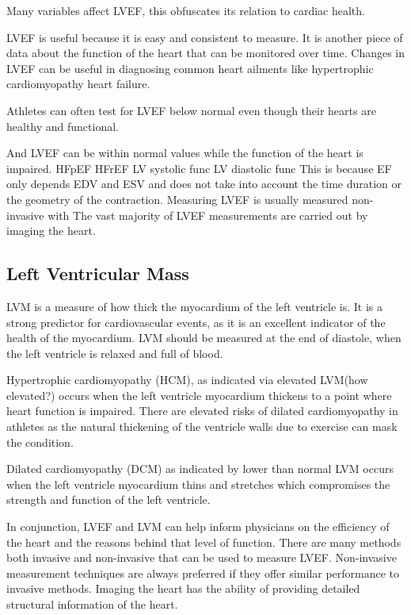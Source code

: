 \documentclass[12pt]{article}
\begin{document}
Many variables affect LVEF, this obfuscates its relation to cardiac health. 

LVEF is useful because it is easy and consistent to measure. It is another piece of data about the function of the heart that can be monitored over time.
Changes in LVEF can be useful in diagnosing common heart ailments like hypertrophic cardiomyopathy heart failure.

Athletes can often test for LVEF below normal even though their hearts are healthy and functional\cite{ef_soa}.

And LVEF can be within normal values while the function of the heart is impaired.
HFpEF
HFrEF
LV systolic func
LV diastolic func
This is because EF only depends EDV and ESV and does not take into account the time duration or the geometry of the contraction.
Measuring LVEF is usually measured non-invasive with 
The vast majority of LVEF measurements are carried out by imaging the heart.
 \cite{understanding-echo}
%

\subsection{Left Ventricular Mass}
LVM is a measure of how thick the myocardium of the left ventricle is.
It is a strong predictor for cardiovascular events\cite{cardiac_chamber_quant_update}, as it is an excellent indicator of the health of the myocardium.
LVM should be measured at the end of diastole, when the left ventricle is relaxed and full of blood.

Hypertrophic cardiomyopathy (HCM), as indicated via elevated LVM(how elevated?) occurs when the left ventricle myocardium thickens to a point where heart function is impaired.
There are elevated risks of dilated cardiomyopathy in athletes as the natural thickening of the ventricle walls due to exercise can mask the condition.

Dilated cardiomyopathy (DCM) as indicated by lower than normal LVM occurs when the left ventricle myocardium thins and stretches which compromises the strength and function of the left ventricle. 

In conjunction, LVEF and LVM can help inform physicians on the efficiency of the heart and the reasons behind that level of function.
There are many methods both invasive and non-invasive that can be used to measure LVEF.
Non-invasive measurement techniques are always preferred if they offer similar performance to invasive methods.
Imaging the heart has the ability of providing detailed structural information of the heart.
\end{document}
